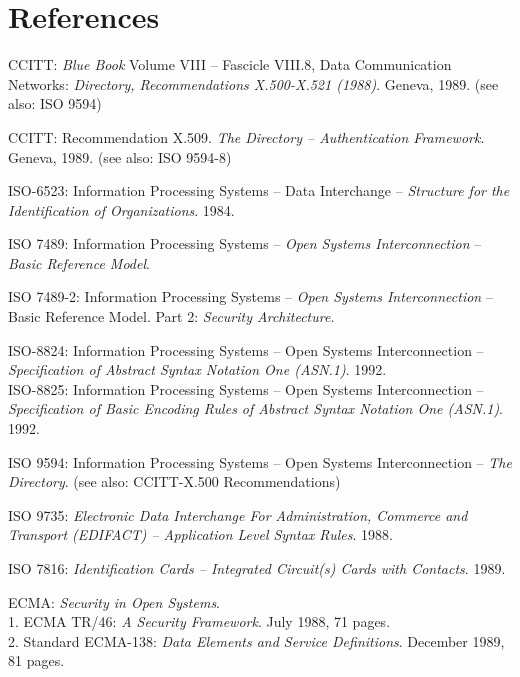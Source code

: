 \section{References}
\thispagestyle{myheadings}
\label{references}

\begin{thebibliography}{99}

CCITT: {\em Blue Book} Volume VIII -- Fascicle VIII.8,
Data Communication Networks:
{\em Directory, Recommendations X.500-X.521 (1988)}.
Geneva, 1989.
(see also: ISO 9594)

CCITT: Recommendation X.509.
{\em The Directory -- Authentication Framework}.
Geneva, 1989.
(see also: ISO 9594-8)

ISO-6523:
Information Processing Systems --
Data Interchange --
{\em Structure for the Identification of Organizations}.
1984.

ISO 7489:
Information Processing Systems --
{\em Open Systems Interconnection} --
{\em Basic Reference Model}.

ISO 7489-2:
Information Processing Systems --
{\em Open Systems Interconnection} --
Basic Reference Model.
Part 2: {\em Security Architecture}.

ISO-8824:
Information Processing Systems --
Open Systems Interconnection --
{\em Specification of Abstract Syntax Notation One (ASN.1)}.
1992.\\
ISO-8825:
Information Processing Systems --
Open Systems Interconnection --
{\em Specification of Basic Encoding Rules of
Abstract Syntax Notation One (ASN.1)}.
1992.

ISO 9594:
Information Processing Systems --
Open Systems Interconnection --
{\em The Directory}.
(see also: CCITT-X.500 Recommendations)

ISO 9735:
{\em Electronic Data Interchange For Administration, Commerce
and Transport (EDIFACT) -- Application Level Syntax Rules}.
1988.

ISO 7816:
{\em Identification Cards --
Integrated Circuit(s) Cards with Contacts}.
1989.

ECMA:
{\em Security in Open Systems}.
\\
1. ECMA TR/46:
{\em A Security Framework}.
July 1988, 71 pages.
\\
2. Standard ECMA-138:
{\em Data Elements and Service Definitions}.
December 1989, 81 pages.


\end{thebibliography}
